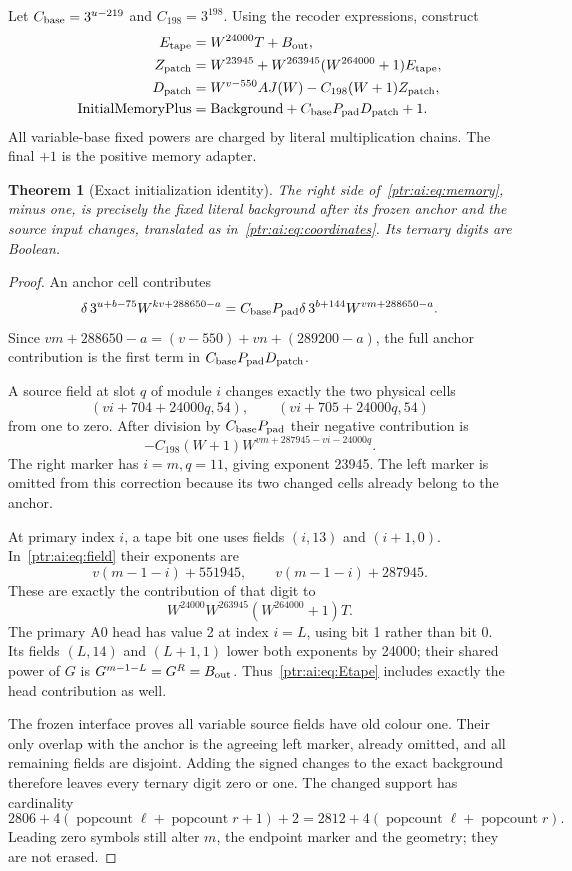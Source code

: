 \documentclass[11pt,letterpaper]{article}
\newtheorem{theorem}{Theorem}[section]
\theoremstyle{definition}\newtheorem{definition}[theorem]{Definition}
\theoremstyle{remark}\newtheorem{remark}[theorem]{Remark}
\newcommand{\pop}{\operatorname{popcount}}
\newcommand{\IM}{\mathrm{InitialMemoryPlus}}\newcommand{\IH}{\mathrm{InitialHead}}
\begin{document}
Let $C_{\rm base}=3^{u-219}$ and $C_{198}=3^{198}$. Using the recoder expressions, construct
\begin{align}
 E_{\rm tape}&=W^{24000}T+B_{\rm out},\label{ptr:ai:eq:Etape}\\
 Z_{\rm patch}&=W^{23945}+W^{263945}(W^{264000}+1)E_{\rm tape},\label{ptr:ai:eq:Zpatch}\\
 D_{\rm patch}&=W^{v-550}A J(W)-C_{198}(W+1)Z_{\rm patch},\label{ptr:ai:eq:Dpatch}\\
 \IM&=\mathrm{Background}+C_{\rm base}P_{\rm pad}D_{\rm patch}+1.\label{ptr:ai:eq:memory}
\end{align}
All variable-base fixed powers are charged by literal multiplication chains. The final $+1$ is the positive memory adapter.

\begin{theorem}[Exact initialization identity]\label{ptr:ai:thm:memory}
The right side of~\eqref{ptr:ai:eq:memory}, minus one, is precisely the fixed literal background after its frozen anchor and the source input changes, translated as in~\eqref{ptr:ai:eq:coordinates}. Its ternary digits are Boolean.
\end{theorem}
\begin{proof}
An anchor cell contributes
\[
 \delta\,3^{u+b-75}W^{kv+288650-a}
 =C_{\rm base}P_{\rm pad}\delta\,3^{b+144}W^{vm+288650-a}.
\]
Since $vm+288650-a=(v-550)+vn+(289200-a)$, the full anchor contribution is the first term in $C_{\rm base}P_{\rm pad}D_{\rm patch}$.

A source field at slot $q$ of module $i$ changes exactly the two physical cells
\[
 (vi+704+24000q,54),\qquad(vi+705+24000q,54)
\]
from one to zero. After division by $C_{\rm base}P_{\rm pad}$ their negative contribution is
\begin{equation}\label{ptr:ai:eq:field}
 -C_{198}(W+1)W^{vm+287945-vi-24000q}.
\end{equation}
The right marker has $i=m,q=11$, giving exponent 23945. The left marker is omitted from this correction because its two changed cells already belong to the anchor.

At primary index $i$, a tape bit one uses fields $(i,13)$ and $(i+1,0)$. In~\eqref{ptr:ai:eq:field} their exponents are
\[
 v(m-1-i)+551945,\qquad v(m-1-i)+287945.
\]
These are exactly the contribution of that digit to
\[
 W^{24000}W^{263945}(W^{264000}+1)T.
\]
The primary A0 head has value 2 at index $i=L$, using bit 1 rather than bit 0. Its fields $(L,14)$ and $(L+1,1)$ lower both exponents by 24000; their shared power of $G$ is $G^{m-1-L}=G^R=B_{\rm out}$. Thus~\eqref{ptr:ai:eq:Etape} includes exactly the head contribution as well.

The frozen interface proves all variable source fields have old colour one. Their only overlap with the anchor is the agreeing left marker, already omitted, and all remaining fields are disjoint. Adding the signed changes to the exact background therefore leaves every ternary digit zero or one. The changed support has cardinality
\[
 2806+4(\pop\ell+\pop r+1)+2
 =2812+4(\pop\ell+\pop r).
\]
Leading zero symbols still alter $m$, the endpoint marker and the geometry; they are not erased.
\end{proof}
\end{document}
